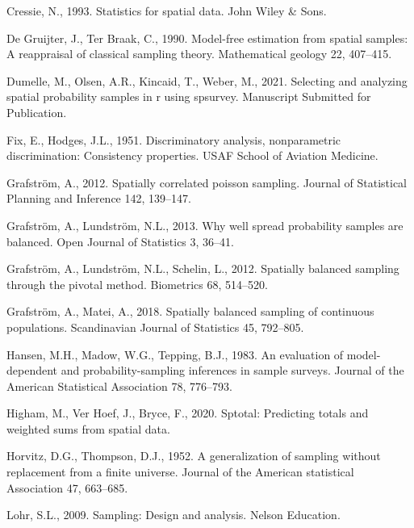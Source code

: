 \documentclass[]{elsarticle} %
\begin{document}
\leavevmode\hypertarget{ref-cressie1993statistics}{}%
Cressie, N., 1993. Statistics for spatial data. John Wiley \& Sons.

\leavevmode\hypertarget{ref-de1990model}{}%
De Gruijter, J., Ter Braak, C., 1990. Model-free estimation from spatial
samples: A reappraisal of classical sampling theory. Mathematical
geology 22, 407--415.

\leavevmode\hypertarget{ref-dumelle2021spsurvey}{}%
Dumelle, M., Olsen, A.R., Kincaid, T., Weber, M., 2021. Selecting and
analyzing spatial probability samples in r using spsurvey. Manuscript
Submitted for Publication.

\leavevmode\hypertarget{ref-fix1951discriminatory}{}%
Fix, E., Hodges, J.L., 1951. Discriminatory analysis, nonparametric
discrimination: Consistency properties. USAF School of Aviation
Medicine.

\leavevmode\hypertarget{ref-grafstrom2012spatiallypoisson}{}%
Grafström, A., 2012. Spatially correlated poisson sampling. Journal of
Statistical Planning and Inference 142, 139--147.

\leavevmode\hypertarget{ref-grafstrom2013well}{}%
Grafström, A., Lundström, N.L., 2013. Why well spread probability
samples are balanced. Open Journal of Statistics 3, 36--41.

\leavevmode\hypertarget{ref-grafstrom2012spatially}{}%
Grafström, A., Lundström, N.L., Schelin, L., 2012. Spatially balanced
sampling through the pivotal method. Biometrics 68, 514--520.

\leavevmode\hypertarget{ref-grafstrom2018spatially}{}%
Grafström, A., Matei, A., 2018. Spatially balanced sampling of
continuous populations. Scandinavian Journal of Statistics 45, 792--805.

\leavevmode\hypertarget{ref-hansen1983evaluation}{}%
Hansen, M.H., Madow, W.G., Tepping, B.J., 1983. An evaluation of
model-dependent and probability-sampling inferences in sample surveys.
Journal of the American Statistical Association 78, 776--793.

\leavevmode\hypertarget{ref-higham2020sptotal}{}%
Higham, M., Ver Hoef, J., Bryce, F., 2020. Sptotal: Predicting totals
and weighted sums from spatial data.

\leavevmode\hypertarget{ref-horvitz1952generalization}{}%
Horvitz, D.G., Thompson, D.J., 1952. A generalization of sampling
without replacement from a finite universe. Journal of the American
statistical Association 47, 663--685.

\leavevmode\hypertarget{ref-lohr2009sampling}{}%
Lohr, S.L., 2009. Sampling: Design and analysis. Nelson Education.
\end{document}
